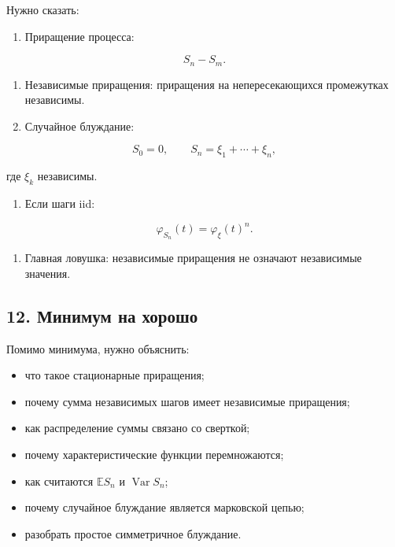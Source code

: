 \documentclass[
  11pt,
  a4paper,
]{article}
\providecommand{\tightlist}{%
  \setlength{\itemsep}{0pt}\setlength{\parskip}{0pt}}
\begin{document}
Нужно сказать:

\begin{enumerate}
\def\labelenumi{\arabic{enumi}.}
\tightlist
\item
  Приращение процесса:
\end{enumerate}

\[
S_n-S_m.
\]

\begin{enumerate}
\def\labelenumi{\arabic{enumi}.}
\setcounter{enumi}{1}
\item
  Независимые приращения: приращения на непересекающихся промежутках
  независимы.
\item
  Случайное блуждание:
\end{enumerate}

\[
S_0=0,
\qquad
S_n=\xi_1+\cdots+\xi_n,
\]

где \(\xi_k\) независимы.

\begin{enumerate}
\def\labelenumi{\arabic{enumi}.}
\setcounter{enumi}{3}
\tightlist
\item
  Если шаги iid:
\end{enumerate}

\[
\varphi_{S_n}(t)=\varphi_\xi(t)^n.
\]

\begin{enumerate}
\def\labelenumi{\arabic{enumi}.}
\setcounter{enumi}{4}
\tightlist
\item
  Главная ловушка: независимые приращения не означают независимые
  значения.
\end{enumerate}

\subsection{12. Минимум на
хорошо}\label{ux43cux438ux43dux438ux43cux443ux43c-ux43dux430-ux445ux43eux440ux43eux448ux43e}

Помимо минимума, нужно объяснить:

\begin{itemize}
\tightlist
\item
  что такое стационарные приращения;
\item
  почему сумма независимых шагов имеет независимые приращения;
\item
  как распределение суммы связано со сверткой;
\item
  почему характеристические функции перемножаются;
\item
  как считаются \(\mathbb ES_n\) и \(\operatorname{Var}S_n\);
\item
  почему случайное блуждание является марковской цепью;
\item
  разобрать простое симметричное блуждание.
\end{itemize}
\end{document}
